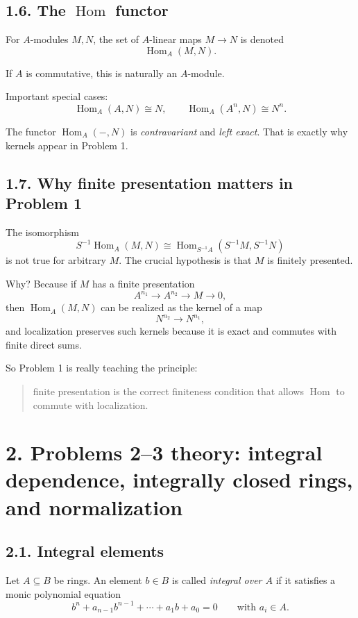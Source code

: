 \documentclass[12pt,a4paper]{article}
\theoremstyle{plain}
\theoremstyle{definition}      %
\begin{document}
\subsection*{1.6. The \texorpdfstring{$\operatorname{Hom}$}{Hom} functor}

For \(A\)-modules \(M,N\), the set of \(A\)-linear maps \(M\to N\) is denoted
\[
\operatorname{Hom}_A(M,N).
\]

If \(A\) is commutative, this is naturally an \(A\)-module.

Important special cases:
\[
\operatorname{Hom}_A(A,N)\cong N,
\qquad
\operatorname{Hom}_A(A^n,N)\cong N^n.
\]

The functor \(\operatorname{Hom}_A(-,N)\) is \emph{contravariant} and \emph{left exact}. That is exactly why kernels appear in Problem 1.

\subsection*{1.7. Why finite presentation matters in Problem 1}

The isomorphism
\[
S^{-1}\operatorname{Hom}_A(M,N)\cong \operatorname{Hom}_{S^{-1}A}(S^{-1}M,S^{-1}N)
\]
is not true for arbitrary \(M\). The crucial hypothesis is that \(M\) is finitely presented.

Why? Because if \(M\) has a finite presentation
\[
A^{n_1}\to A^{n_2}\to M\to 0,
\]
then \(\operatorname{Hom}_A(M,N)\) can be realized as the kernel of a map
\[
N^{n_2}\to N^{n_1},
\]
and localization preserves such kernels because it is exact and commutes with finite direct sums.

So Problem 1 is really teaching the principle:
\begin{quote}
	finite presentation is the correct finiteness condition that allows \(\operatorname{Hom}\) to commute with localization.
\end{quote}

\bigskip

\section*{2. Problems 2--3 theory: integral dependence, integrally closed rings, and normalization}

\subsection*{2.1. Integral elements}

Let \(A\subseteq B\) be rings. An element \(b\in B\) is called \emph{integral over \(A\)} if it satisfies a monic polynomial equation
\[
b^n+a_{n-1}b^{n-1}+\cdots+a_1b+a_0=0
\qquad\text{with }a_i\in A.
\]
\end{document}
